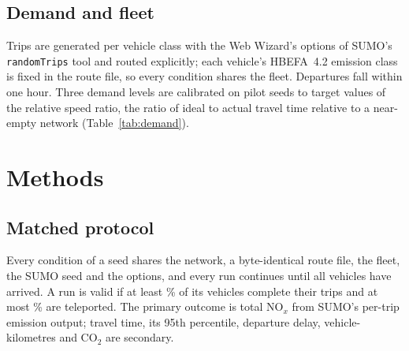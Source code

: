 \documentclass[11pt]{article}
\begin{document}
\begin{table}[htbp]
\centering\small
\caption{The two network codings. Edges, lanes and signals are identical; speeds are shown as the modal speed of
each road class with its share of the class's lane-km.}
\label{tab:networks}

\end{table}

\subsection{Demand and fleet}
Trips are generated per vehicle class with the Web Wizard's options of SUMO's \texttt{randomTrips} tool and routed
explicitly; each vehicle's HBEFA~4.2 emission class is fixed in the route file, so every condition shares the fleet.
Departures fall within one hour. Three demand levels are calibrated on pilot seeds to target values of the relative
speed ratio, the ratio of ideal to actual travel time relative to a near-empty network (Table~\ref{tab:demand}).

\begin{table}[htbp]
\centering\small
\caption{Calibrated demand levels (density in vehicles per hour per km of road; RSR = relative speed ratio,
achieved mean over pilot seeds). $^{a}$Target not reached: denser demand made pilot runs fail the validity rule, so
the most congested valid density is used.}
\label{tab:demand}

\end{table}

\section{Methods}\label{sec:methods}
\subsection{Matched protocol}
Every condition of a seed shares the network, a byte-identical route file, the fleet, the SUMO seed and the options,
and every run continues until all vehicles have arrived. A run is valid if at least \ValidCompletionPct\% of its
vehicles complete their trips and at most \ValidTeleportPct\% are teleported. The primary outcome is total NO$_x$
from SUMO's per-trip emission output; travel time, its 95th percentile, departure delay, vehicle-kilometres and
CO$_2$ are secondary.
\end{document}
